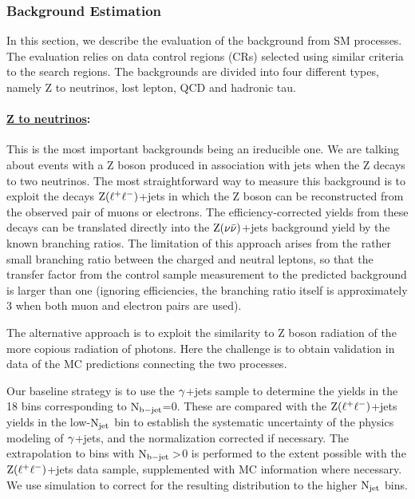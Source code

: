 \subsubsection{Background Estimation }
In this section, we describe the evaluation of the background from SM processes. The evaluation
relies on data control regions (CRs) selected using similar criteria to the search regions. The backgrounds are 
divided into four different types, namely Z to neutrinos, lost lepton, QCD and hadronic tau.

\paragraph{\underline {Z to neutrinos}: }


This is the most important backgrounds being an ireducible one. We are talking about events with a Z boson produced in association with jets when the Z decays to two neutrinos. The most straightforward way to measure this background is
to exploit the decays $\rm Z(\ell^{+} \ell^{-})$+jets in which the Z boson can be
reconstructed from the observed pair of muons or electrons.  The
efficiency-corrected yields from these decays can be translated
directly into the $\rm Z(\nu \bar{\nu})$+jets background yield by the known branching
ratios.  The limitation of this approach arises from the rather small
branching ratio between the charged and neutral leptons, so that the
transfer factor from the control sample measurement to the predicted
background is larger than one (ignoring efficiencies, the
branching ratio itself is approximately 3 when both muon and electron
pairs are used). 

The alternative approach is to exploit the similarity to Z boson
radiation of the more copious radiation of photons.  Here the
challenge is to obtain validation in data of the MC predictions
connecting the two processes.

Our baseline strategy is to use the $\rm \gamma$+jets sample to determine the
yields in the 18 bins corresponding to $\rm N_{b-jet}$=0.  These are
compared with the $\rm Z(\ell^{+} \ell^{-})$+jets yields in the low-$\rm N_{jet}$
bin to establish the systematic uncertainty of the physics modeling of
$\rm \gamma$+jets, and the normalization corrected if necessary.  
The extrapolation to bins with $\rm N_{b-jet}>$0 is performed to
the extent possible with the $\rm Z(\ell^{+} \ell^{-})$+jets data sample, supplemented with MC
information where necessary. We use simulation to correct for the
resulting distribution to the higher $\rm N_{jet}$ bins.


